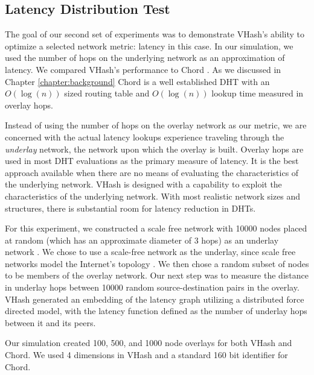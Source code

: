 \subsection{Latency Distribution Test}
The goal of our second set of experiments was to demonstrate VHash's ability to optimize a selected network metric: latency in this case.
In our simulation, we used the number of hops on the underlying network as an approximation of latency.
We compared VHash's performance to Chord \cite{chord}.
As we discussed in Chapter \ref{chapter:background} Chord is a well established DHT with an $O(\log(n))$ sized routing table and $O(\log(n))$ lookup time measured in overlay hops.

Instead of using the number of hops on the overlay network as our metric, we are concerned with the actual latency lookups experience traveling through the \emph{underlay} network, the network upon which the overlay is built.
Overlay hops are used in most DHT evaluations as the primary measure of latency.
It is the best approach available when there are no means of evaluating the characteristics of the underlying network.
VHash is designed with a capability to exploit the characteristics of the underlying network.
With most realistic network sizes and structures, there is substantial room for latency reduction in DHTs.

For this experiment, we constructed a scale free network with 10000 nodes placed at random (which has an approximate diameter of 3 hops) as an underlay network \cite{cohen2000resilience} \cite{pastor2001epidemic} \cite{hagberg2004}.
We chose to use a scale-free network as the underlay, since  scale free networks model the Internet's topology \cite{cohen2000resilience} \cite{pastor2001epidemic}.
We then chose a random subset of nodes to be members of the overlay network.
Our next step was to measure the distance in underlay hops between 10000 random source-destination pairs in the overlay.
VHash generated an embedding of the latency graph utilizing a distributed force directed model, with the latency function defined as the number of underlay hops between it and its peers.

Our simulation created 100, 500, and 1000 node overlays for both VHash and Chord.
We used 4 dimensions in VHash and a standard 160 bit identifier for Chord.




